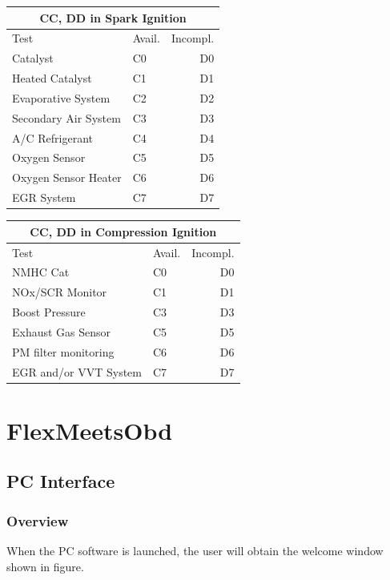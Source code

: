 \documentclass[twoside]{article}
\begin{document}
\begin{multicols}{2}
\begin{table}[H]
\centering
\begin{tabular}{llr}
\multicolumn{3}{c}{CC, DD in Spark Ignition} \\
\toprule
Test & Avail. & Incompl. \\
\midrule
Catalyst & C0 & D0 \\
Heated Catalyst & C1 & D1 \\
Evaporative System & C2 & D2 \\
Secondary Air System & C3 & D3 \\
A/C Refrigerant & C4 & D4 \\
Oxygen Sensor & C5 & D5 \\
Oxygen Sensor Heater & C6 & D6 \\
EGR System & C7 & D7 \\
\bottomrule
\end{tabular}
\end{table}

\begin{table}[H]
\centering
\begin{tabular}{llr}
\multicolumn{3}{c}{CC, DD in Compression Ignition} \\
\toprule
Test & Avail. & Incompl. \\
\midrule
NMHC Cat & C0 & D0 \\
NOx/SCR Monitor & C1 & D1 \\
Boost Pressure & C3 & D3 \\
Exhaust Gas Sensor & C5 & D5 \\
PM filter monitoring & C6 & D6 \\
EGR and/or VVT System & C7 & D7 \\
\bottomrule
\end{tabular}
\end{table}

\section{FlexMeetsObd}

\subsection{PC Interface}

\subsubsection{Overview}

When the PC software is launched, the user will obtain the welcome window shown in figure.


\end{multicols}
\end{document}
